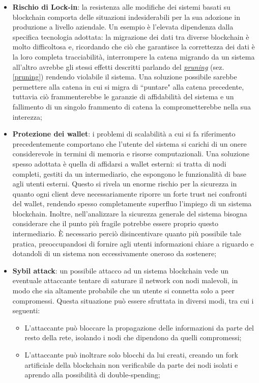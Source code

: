 \begin{itemize}
				\item \textbf{Rischio di Lock-in}: la resistenza alle modifiche dei sistemi basati su blockchain comporta delle situazioni indesiderabili per la sua adozione in produzione a livello aziendale. Un esempio è l'elevata dipendenza dalla specifica tecnologia adottata: la migrazione dei dati tra diverse blockchain è molto difficoltosa e, ricordando che ciò che garantisce la correttezza dei dati è la loro completa tracciabilità, interrompere la catena migrando da un sistema all'altro avrebbe gli stessi effetti descritti parlando del \hyperref[pruning]{\emph{pruning}} (sez. \ref{pruning}) rendendo violabile il sistema. Una soluzione possibile sarebbe permettere alla catena in cui si migra di ``puntare" alla catena precedente, tuttavia ciò frammenterebbe le garanzie di affidabilità del sistema e un fallimento di un singolo frammento di catena la comprometterebbe nella sua interezza;
				\item \textbf{Protezione dei wallet}: i problemi di scalabilità a cui si fa riferimento precedentemente comportano che l'utente del sistema si carichi di un onere considerevole in termini di memoria e risorse computazionali. Una soluzione spesso adottata è quella di affidarsi a wallet esterni: si tratta di nodi completi, gestiti da un intermediario, che espongono le funzionalità di base agli utenti esterni. Questo si rivela un enorme rischio per la sicurezza in quanto ogni client deve necessariamente riporre un forte trust nei confronti del wallet, rendendo spesso completamente superfluo l'impiego di un sistema blockchain. Inoltre, nell'analizzare la sicurezza generale del sistema bisogna considerare che il punto più fragile potrebbe essere proprio questo intermediario. È necessario perciò disincentivare quanto più possibile tale pratica, preoccupandosi di fornire agli utenti informazioni chiare a riguardo e dotandoli di un sistema non eccessivamente oneroso da sostenere;
				\item \textbf{Sybil attack}: un possibile attacco ad un sistema blockchain vede un eventuale attaccante tentare di saturare il network con nodi malevoli, in modo che sia altamente probabile che un utente si connetta solo a peer compromessi. Questa situazione può essere sfruttata in diversi modi, tra cui i seguenti:
				\begin{itemize}
					\item L'attaccante può bloccare la propagazione delle informazioni da parte del resto della rete, isolando i nodi che dipendono da quelli compromessi;
					\item L'attaccante può inoltrare solo blocchi da lui creati, creando un fork artificiale della blockchain non verificabile da parte dei nodi isolati e aprendo alla possibilità di double-spending;

\end{itemize}
\end{itemize}
